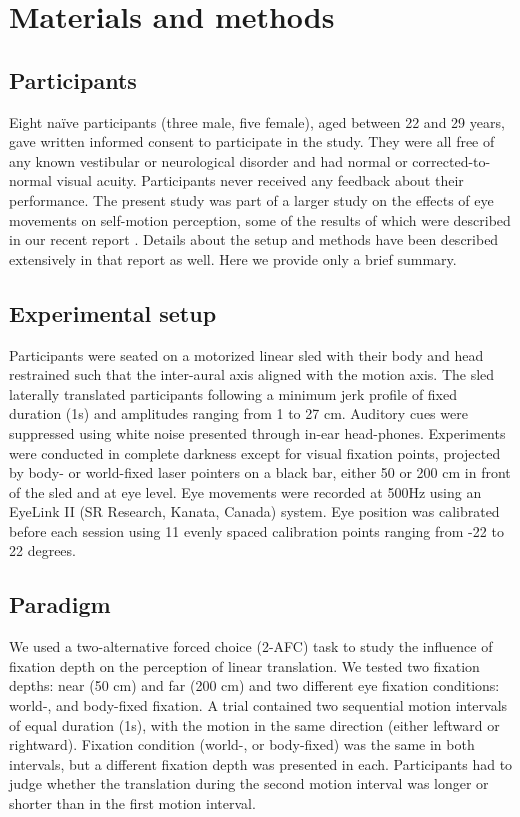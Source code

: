 \section{Materials and methods}
\label{p4:sec:methods}

\subsection{Participants}

Eight na\"ive participants (three male, five female), aged between 22 and 29 years, gave written informed consent to participate in the study. They were all free of any known vestibular or neurological disorder and had normal or corrected-to-normal visual acuity. Participants never received any feedback about their performance. The present study was part of a larger study on the effects of eye movements on self-motion perception, some of the results of which were described in our recent report \cite{clemens2015a}. Details about the setup and methods have been described extensively in that report as well. Here we provide only a brief summary.


\subsection{Experimental setup}

Participants were seated on a motorized linear sled with their body and head restrained such that the inter-aural axis aligned with the motion axis. The sled laterally translated participants following a minimum jerk profile of fixed duration (1s) and amplitudes ranging from 1 to 27 \si{\centi\metre}. Auditory cues were suppressed using white noise presented through in-ear head-phones. Experiments were conducted in complete darkness except for visual fixation points, projected by body- or world-fixed laser pointers on a black bar, either 50 or 200 \si{\centi\metre} in front of the sled and at eye level. Eye movements were recorded at 500Hz using an EyeLink II (SR Research, Kanata, Canada) system. Eye position was calibrated before each session using 11 evenly spaced calibration points ranging from -22 to 22 degrees.


\subsection{Paradigm}

We used a two-alternative forced choice (2-AFC) task to study the influence of fixation depth on the perception of linear translation. We tested two fixation depths: near (50 cm) and far (200 \si{\centi\metre}) and two different eye fixation conditions: world-, and body-fixed fixation. A trial contained two sequential motion intervals of equal duration (1s), with the motion in the same direction (either leftward or rightward). Fixation condition (world-, or body-fixed) was the same in both intervals, but a different fixation depth was presented in each. Participants had to judge whether the translation during the second motion interval was longer or shorter than in the first motion interval.

